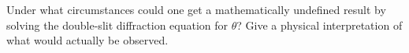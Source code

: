 Under what circumstances could one get a mathematically
undefined result by solving the double-slit diffraction
equation for $\theta $? Give a physical interpretation of
what would actually be observed.

